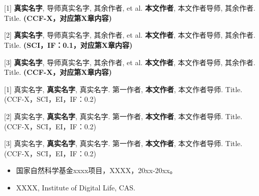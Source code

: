 \chapter*{}

\vskip 5mm
\vskip 5mm

[1] \ifnotanonymous \textbf{真实名字}, 导师真实名字, 其余作者, et al.  \else \textbf{本文作者}, 本文作者导师, 其余作者. \fi Title. \textbf{(CCF-X，对应第X章内容)}     

[2] \ifnotanonymous \textbf{真实名字}, 导师真实名字, 其余作者, et al.  \else \textbf{本文作者}, 本文作者导师, 其余作者. \fi Title. \textbf{(SCI，IF：0.1，对应第X章内容)}     

[3]  \ifnotanonymous \textbf{真实名字}, 导师真实名字, 其余作者, et al.  \else \textbf{本文作者}, 本文作者导师, 其余作者. \fi Title. \textbf{(CCF-X，对应第X章内容)}   


\vskip 5mm
\iffalse
[1] Tong P, \textbf{Zhang Q}, Yao J. Leveraging domain context for question answering over knowledge graph[J]. Data Science and Engineering, 2019, 4(4): 323-335. (CCF-C，ESCI，EI，IF：5.1)

[2] Yang Y, \textbf{Zhang Q}, Yao J. Task-Driven Neural Natural Language Interface to Database[C]//International Conference on Web Information Systems Engineering. 2023: 659-673. (CCF-C)

[3] Li, Q; \textbf{Zhang, Q}; Yao J, et al. Event extraction for criminal legal text, 11th IEEE International Conference on Knowledge Graph, ICKG 2020.     (EI)

[4] Pu, T; \textbf{Zhang, Q}; Yao J, et al. Medical entity extraction from health insurance documents, 11th IEEE International Conference on Knowledge Graph, ICKG 2020.     (EI)
\fi

[1] \ifnotanonymous 真实名字, \textbf{真实名字}, 真实名字.  \else 第一作者, \textbf{本文作者}, 本文作者导师. \fi Title. (CCF-X，SCI，EI，IF：0.2)  

[2] \ifnotanonymous 真实名字, \textbf{真实名字}, 真实名字.  \else 第一作者, \textbf{本文作者}, 本文作者导师. \fi Title. (CCF-X，SCI，EI，IF：0.2)  

[3] \ifnotanonymous 真实名字, \textbf{真实名字}, 真实名字.  \else 第一作者, \textbf{本文作者}, 本文作者导师. \fi Title. (CCF-X，SCI，EI，IF：0.2) 


\bigskip\bigskip


\ifnotanonymous {}\vskip 5mm 

\begin{itemize}
  \item 国家自然科学基金xxxx项目，XXXX，20xx-20xx。
  \item XXXX, Institute of Digital Life, CAS.
\end{itemize}

\else \fi




\bigskip\bigskip\bigskip
